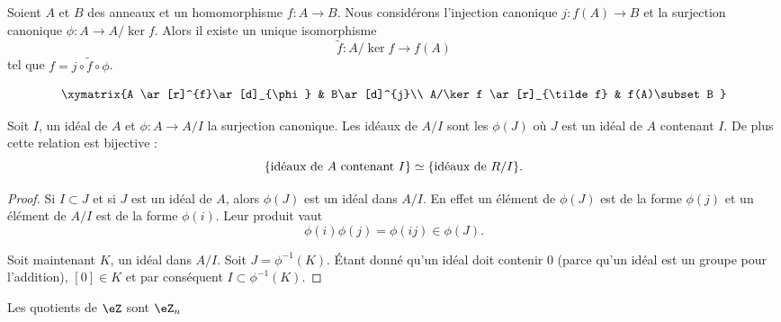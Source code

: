 \begin{proposition}
    Soient \( A\) et \( B\) des anneaux et un homomorphisme \( f\colon A\to B\). Nous considérons l'injection canonique \( j\colon f(A)\to B\) et la surjection canonique \( \phi\colon A\to A/\ker f\). Alors il existe un unique isomorphisme
    \begin{equation}
        \tilde f \colon A/\ker f\to f(A)
    \end{equation}
    tel que \( f=j\circ\tilde f\circ\phi\).

    \begin{equation}
        \xymatrix{%
        A \ar[r]^{f}\ar[d]_{\phi}        &   B\ar[d]^{j}\\
           A/\ker f \ar[r]_{\tilde f}   &   f(A)\subset B
           }
    \end{equation}
\end{proposition}

\begin{proposition}     \label{PropIJJIdsousphi}
    Soit \( I\), un idéal de \( A\) et \( \phi\colon A\to A/I\) la surjection canonique. Les idéaux de \( A/I\) sont les \( \phi(J)\) où \( J\) est un idéal de \( A\) contenant \( I\). De plus cette relation est bijective :
    \begin{equation}        \label{EqKbrizu}
        \{ \text{idéaux de \( A\) contenant \( I\)}\}\simeq\{ \text{idéaux de \( R/I\)} \}.
    \end{equation}
\end{proposition}

\begin{proof}
    Si \( I\subset J\) et si \( J \) est un idéal de \( A\), alors \( \phi(J)\) est un idéal dans \( A/I\). En effet un élément de \( \phi(J)\) est de la forme \( \phi(j)\) et un élément de \( A/I\) est de la forme \( \phi(i)\). Leur produit vaut
    \begin{equation}
        \phi(i)\phi(j)=\phi(ij)\in\phi(J).
    \end{equation}
    
    Soit maintenant \( K\), un idéal dans \( A/I\). Soit \( J=\phi^{-1}(K)\). Étant donné qu'un idéal doit contenir \( 0\) (parce qu'un idéal est un groupe pour l'addition), \( [0]\in K\) et par conséquent \( I\subset\phi^{-1}(K)\).

\end{proof}

\begin{corollary}
    Les quotients de \( \eZ\) sont \( \eZ_n\)
\end{corollary}

